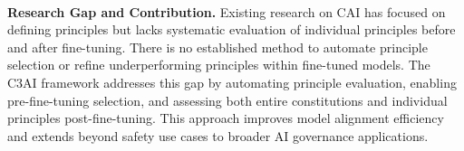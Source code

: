 \mbox{ } \\
\textbf{Research Gap and Contribution.} Existing research on CAI has focused on defining principles \cite{bai2022constitutional, petridis2024constitutionmaker, findeis2024inverse} but lacks systematic evaluation of individual principles before and after fine-tuning. There is no established method to automate principle selection or refine underperforming principles within fine-tuned models. The C3AI framework addresses this gap by automating principle evaluation, enabling pre-fine-tuning selection, and assessing both entire constitutions and individual principles post-fine-tuning. This approach improves model alignment efficiency and extends beyond safety use cases to broader AI governance applications.